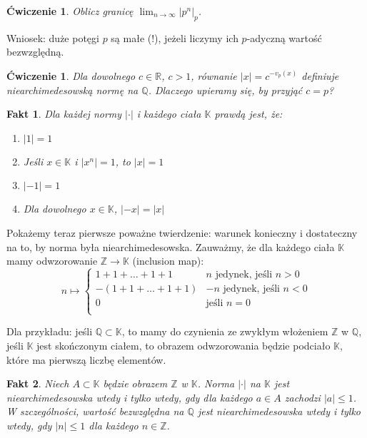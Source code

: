 \documentclass[a4paper,fleqn,9pt]{extarticle}
\newtheorem{prb}[prbh]{\'Cwiczenie}
\newtheorem{fkt}{Fakt}
\newenvironment{enumx}{\begin{enumerate}
	\setlength{\itemsep}{0pt}
	\setlength{\parskip}{0pt}
	\setlength{\parsep}{0pt}}
{\end{enumerate}}
\begin{document}

\begin{prb}Oblicz granicę $\lim_{n\to\infty} |p^n|_p$.\end{prb}

Wniosek: duże potęgi $p$ są małe (!), jeżeli liczymy ich $p$-adyczną wartość bezwzględną.

\begin{prb}Dla dowolnego $c\in\mathbb R$, $c>1$, równanie $|x| = c^{-v_p(x)}$ definiuje niearchimedesowską normę na $\mathbb Q$. Dlaczego upieramy się, by przyjąć $c=p$?\end{prb}

\begin{fkt}Dla każdej normy $|\cdot|$ i każdego ciała $\mathbb K$ prawdą jest, że:
\begin{enumx}
\item $|1| = 1$
\item Jeśli $x\in\mathbb K$ i $|x^n| = 1$, to $|x| = 1$
\item $|-1| = 1$
\item Dla dowolnego $x\in\mathbb K$, $|-x| = |x|$
\end{enumx}
\end{fkt}

Pokażemy teraz pierwsze poważne twierdzenie: warunek konieczny i dostateczny na to, by norma była niearchimedesowska. Zauważmy, że dla każdego ciała $\mathbb K$ mamy odwzorowanie $\mathbb Z \rightarrow \mathbb K$ (inclusion map):
\begin{equation*}
n \mapsto
\begin{cases}
{1 + 1 + \dots + 1 + 1} & n\text{ jedynek, jeśli } n > 0 \\
- ({1 + 1 + \dots + 1 + 1}) & -n \text{ jedynek, jeśli } n < 0 \\
 0  & \text{jeśli } n = 0 \\
 \end{cases}
\end{equation*}

Dla przykładu: jeśli $\mathbb Q \subset \mathbb K$, to mamy do czynienia ze zwykłym włożeniem $\mathbb Z$ w $\mathbb Q$, jeśli $\mathbb K$ jest skończonym ciałem, to obrazem odwzorowania będzie podciało $\mathbb K$, które ma pierwszą liczbę elementów.

\begin{fkt}Niech $A\subset \mathbb K$ będzie obrazem $\mathbb Z$ w $\mathbb K$. Norma $|\cdot |$ na $\mathbb K$ jest niearchimedesowska wtedy i tylko wtedy, gdy dla każdego $a\in A$ zachodzi $|a| \le 1$. W szczególności, wartość bezwzględna na $\mathbb Q$ jest niearchimedesowska wtedy i tylko wtedy, gdy $|n|\le 1$ dla każdego $n\in \mathbb Z$.\end{fkt}
\end{document}
